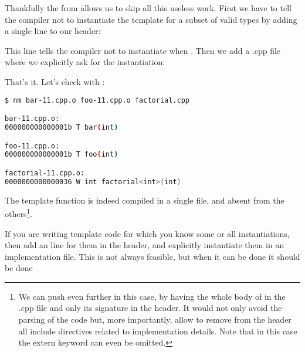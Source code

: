 \solutiontitle

Thankfully the  from  allows us to skip
all this useless work. First we have to tell the compiler not to
instantiate the template for a subset of valid types by adding a
single line to our header:


This line tells the compiler not to instantiate
 when . Then we add a .cpp file
where we explicitly ask for the instantiation:



That's it. Let's check with :

\begin{lstlisting}[language=bash]
$ nm bar-11.cpp.o foo-11.cpp.o factorial.cpp

bar-11.cpp.o:
000000000000001b T bar(int)

foo-11.cpp.o:
000000000000001b T foo(int)

factorial-11.cpp.o:
0000000000000036 W int factorial<int>(int)
\end{lstlisting}

The template function is indeed compiled in a single file, and absent
from the others\footnote{We can push even further in this case, by
having the whole body of  in the .cpp file and only
its signature in the header. It would not only avoid the parsing of
the code but, more importantly, allow to remove from the header all
include directives related to implementation details. Note that in
this case the extern keyword can even be omitted.}.

\begin{guideline}
If you are writing template code for which you know some or all
instantiations, then add an  line for them in
the header, and explicitly instantiate them in an implementation file.
This is not always feasible, but when it can be done it should be done
\end{guideline}
